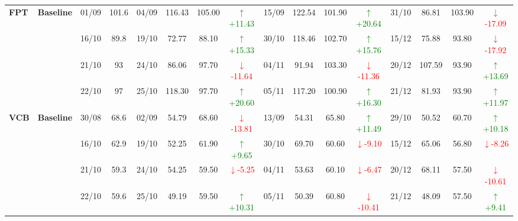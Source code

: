 \documentclass{ieeeaccess}
\begin{document}
{\begin{longtable}{llcc|cccc|cccc|cccc}
\multirow{4}{*}{\textbf{FPT}}
& \textbf{Baseline}
& 01/09 & 101.6 & 04/09 & 116.43 & 105.00 & \textcolor{green}{\(\uparrow\)+11.43} & 15/09 & 122.54 & 101.90 & \textcolor{green}{\(\uparrow\)+20.64} & 31/10 & 86.81 & 103.90 & \textcolor{red}{\(\downarrow\)-17.09} \\
& & 16/10 & 89.8 & 19/10 & 72.77 & 88.10 & \textcolor{green}{\(\uparrow\)+15.33} & 30/10 & 118.46 & 102.70 & \textcolor{green}{\(\uparrow\)+15.76} & 15/12 & 75.88 & 93.80 & \textcolor{red}{\(\downarrow\)-17.92} \\
& & 21/10 & 93 & 24/10 & 86.06 & 97.70 & \textcolor{red}{\(\downarrow\)-11.64} & 04/11 & 91.94 & 103.30 & \textcolor{red}{\(\downarrow\)-11.36} & 20/12 & 107.59 & 93.90 & \textcolor{green}{\(\uparrow\)+13.69} \\
& & 22/10 & 97 & 25/10 & 118.30 & 97.70 & \textcolor{green}{\(\uparrow\)+20.60} & 05/11 & 117.20 & 100.90 & \textcolor{green}{\(\uparrow\)+16.30} & 21/12 & 81.93 & 93.90 & \textcolor{green}{\(\uparrow\)+11.97} \\
\midrule

\multirow{4}{*}{\textbf{VCB}}
& \textbf{Baseline}
& 30/08 & 68.6 & 02/09 & 54.79 & 68.60 & \textcolor{red}{\(\downarrow\)-13.81} & 13/09 & 54.31 & 65.80 & \textcolor{green}{\(\uparrow\)+11.49} & 29/10 & 50.52 & 60.70 & \textcolor{green}{\(\uparrow\)+10.18} \\
& & 16/10 & 62.9 & 19/10 & 52.25 & 61.90 & \textcolor{green}{\(\uparrow\)+9.65} & 30/10 & 69.70 & 60.60 & \textcolor{red}{\(\downarrow\)-9.10} & 15/12 & 65.06 & 56.80 & \textcolor{red}{\(\downarrow\)-8.26} \\
& & 21/10 & 59.3 & 24/10 & 54.25 & 59.50 & \textcolor{red}{\(\downarrow\)-5.25} & 04/11 & 53.63 & 60.10 & \textcolor{red}{\(\downarrow\)-6.47} & 20/12 & 68.11 & 57.50 & \textcolor{red}{\(\downarrow\)-10.61} \\
& & 22/10 & 59.6 & 25/10 & 49.19 & 59.50 & \textcolor{green}{\(\uparrow\)+10.31} & 05/11 & 50.39 & 60.80 & \textcolor{red}{\(\downarrow\)-10.41} & 21/12 & 48.09 & 57.50 & \textcolor{green}{\(\uparrow\)+9.41} \\
\midrule


\end{longtable}}
\end{document}
